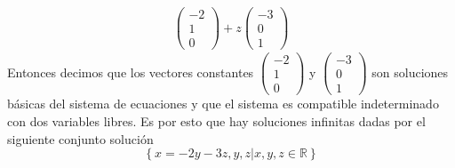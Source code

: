 \documentclass[12pt, letterpaper]{article}
\begin{document}
\begin{enumerate}
\begin{equation*}
\begin{aligned}
            \begin{pmatrix}
                -2 \\
                1 \\
                0
            \end{pmatrix}
            + z
            \begin{pmatrix}
                -3 \\
                0 \\
                1
            \end{pmatrix}
        \end{aligned}
    \end{equation*}
    Entonces decimos que los vectores constantes
    $\begin{pmatrix}
        -2 \\
        1 \\
        0
    \end{pmatrix}$ y
    $\begin{pmatrix}
        -3 \\
        0 \\
        1
    \end{pmatrix}$
    son soluciones básicas del sistema de ecuaciones y que el sistema es compatible indeterminado con dos variables libres. Es por esto que hay soluciones infinitas dadas por el siguiente conjunto solución
    \begin{equation*}
        \left\{ 
            x = -2y-3z, y, z | x,y,z \in \mathbb{R} 
        \right\}
    \end{equation*}
\end{enumerate}

\newpage
\end{document}
